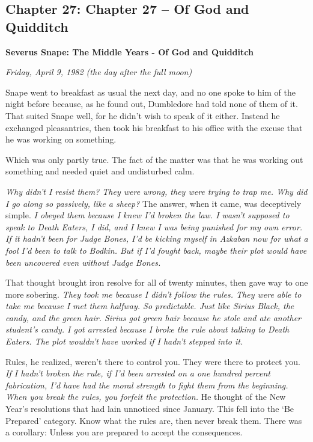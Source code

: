 \documentclass[a4paper,11pt]{article}
\begin{document}
\subsection{Chapter 27: Chapter 27 – Of God and Quidditch}

\textbf{Severus Snape: The Middle Years - Of God and Quidditch}

\emph{Friday, April 9, 1982 (the day after the full moon)}

Snape went to breakfast as usual the next day, and no one spoke to him of the night before because, as he found out, Dumbledore had told none of them of it. That suited Snape well, for he didn't wish to speak of it either. Instead he exchanged pleasantries, then took his breakfast to his office with the excuse that he was working on something.

Which was only partly true. The fact of the matter was that he was working out something and needed quiet and undisturbed calm.

\emph{Why didn't I resist them? They were wrong, they were trying to trap me. Why did I go along so passively, like a sheep?} The answer, when it came, was deceptively simple. \emph{I obeyed them because I knew I'd broken the law. I wasn't supposed to speak to Death Eaters, I did, and I knew I was being punished for my own error. If it hadn't been for Judge Bones, I'd be kicking myself in Azkaban now for what a fool I'd been to talk to Bodkin. But if I'd fought back, maybe their plot would have been uncovered even without Judge Bones.}

That thought brought iron resolve for all of twenty minutes, then gave way to one more sobering. \emph{They took me because I didn't follow the rules. They were able to take me because I met them halfway. So predictable. Just like Sirius Black, the candy, and the green hair. Sirius got green hair because he stole and ate another student's candy. I got arrested because I broke the rule about talking to Death Eaters. The plot wouldn't have worked if I hadn't stepped into it.}

Rules, he realized, weren't there to control you. They were there to protect you. \emph{If I hadn't broken the rule, if I'd been arrested on a one hundred percent fabrication, I'd have had the moral strength to fight them from the beginning. When you break the rules, you forfeit the protection.} He thought of the New Year's resolutions that had lain unnoticed since January. This fell into the `Be Prepared' category. Know what the rules are, then never break them. There was a corollary: Unless you are prepared to accept the consequences.
\end{document}
